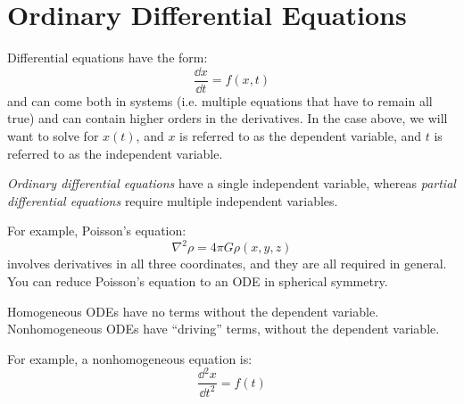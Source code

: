 
\section{Ordinary Differential Equations}

Differential equations have the form:
\begin{equation}
\frac{\dd{x}}{\dd{t}} = f(x, t)
\end{equation}
and can come both in systems (i.e. multiple equations that have to
remain all true) and can contain higher orders in the derivatives. 
In the case above, we will want to solve for $x(t)$, and $x$ is
referred to as the dependent variable, and $t$ is referred to as the
independent variable. 


\begin{answer}
{\it Ordinary differential equations} have a single independent
variable, whereas {\it partial differential equations} require
multiple independent variables. 

For example, Poisson's equation:
\begin{equation}
\nabla^2 \rho = 4 \pi G \rho(x,y,z)
\end{equation}
involves derivatives in all three coordinates, and they are all
required in general. You can reduce Poisson's equation to an ODE in
spherical symmetry.
\end{answer}


\begin{answer}
Homogeneous ODEs have  no terms without the dependent variable.
Nonhomogeneous ODEs have ``driving'' terms, without the dependent
variable.

For example, a nonhomogeneous equation is:
\begin{equation}
\frac{\dd{^2x}}{\dd{t^2}} = f(t)
\end{equation}
\end{answer}


